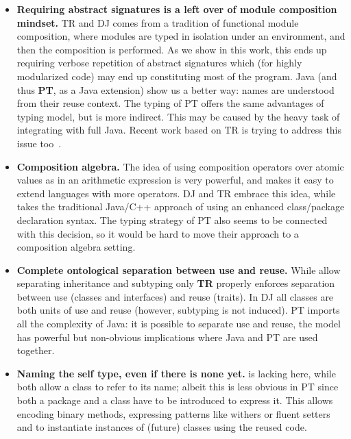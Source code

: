 \begin{itemize}
\item 
{\bf Requiring abstract signatures is a left over of module composition mindset.}
TR and DJ comes from a tradition of functional module composition, where 
modules are typed in isolation under an environment, and then the composition is performed.
As we show in this work, this ends up requiring verbose repetition of abstract signatures
which (for highly modularized code) may end up constituting most of the program.
Java (and thus \textbf{PT}, as a Java extension) show us a better way:
names are understood from their reuse context.
The typing of PT offers the same advantages of \MS{\name} typing model, 
but is more indirect. This may be caused by the
heavy task of integrating with full Java.
Recent work based on TR is trying to address this issue too~\cite{damiani2017unified}.
\item {\bf Composition algebra.}
The idea of using composition operators over atomic values as in an arithmetic expression is very powerful,
and makes it easy to extend languages with more operators. \MS{\name,} DJ and TR embrace this idea, while  takes the traditional Java/C++ approach of using an enhanced class/package declaration syntax.
The typing strategy of PT also seems to be connected with this
decision, so it would be hard to move their approach
to a composition algebra setting.
\item {\bf Complete ontological separation between use and reuse.}
While  allow separating inheritance and subtyping only  \textbf{TR} properly enforces 
separation between use (classes and interfaces) and reuse (traits).
In DJ all classes are both units of use and reuse (however, subtyping is not induced).
PT imports all the complexity of Java: it is possible to separate use and reuse, the model has powerful but non-obvious implications where Java \Q@extends@ and PT are used together.
\item {\bf Naming the self type, even if there is none yet.}
 is lacking here, while  both allow a class to refer to its name; albeit this is
less obvious in PT since both a package and a class have to be introduced to express it.
This allows encoding binary methods, expressing patterns like withers or fluent setters and to instantiate instances of (future) classes  using the reused code.
\end{itemize}
\saveSpace
